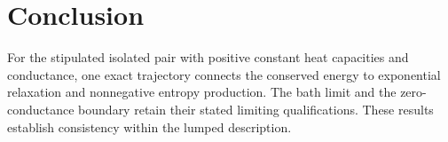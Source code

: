 \section{Conclusion}
For the stipulated isolated pair with positive constant heat capacities and conductance, one exact trajectory connects the conserved energy to exponential relaxation and nonnegative entropy production. The bath limit and the zero-conductance boundary retain their stated limiting qualifications. These results establish consistency within the lumped description.
